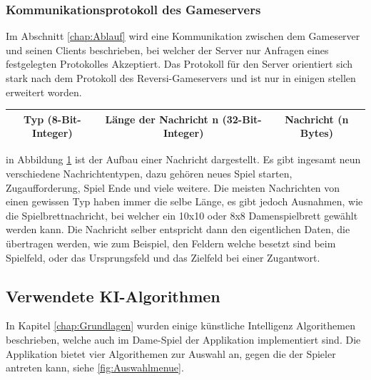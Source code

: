 \documentclass[12pt,a4paper,bibliography=totocnumbered,listof=totocnumbered]{article}
\begin{document}
\subsubsection{Kommunikationsprotokoll des Gameservers}
Im Abschnitt \ref{chap:Ablauf} wird eine Kommunikation zwischen dem Gameserver und seinen Clients beschrieben, bei welcher der 
Server nur Anfragen eines festgelegten Protokolles Akzeptiert. Das Protokoll für den Server orientiert sich stark nach dem Protokoll
des Reversi-Gameservers und ist nur in einigen stellen erweitert worden.
%
\begin{table}[H]
    \centering
    \begin{tabular} {|c|c|c|}
        \hline
        Typ (8-Bit-Integer) & Länge der Nachricht n (32-Bit-Integer) & Nachricht (n Bytes) \\
        \hline
    \end{tabular}
    \label{fig:Nachritenaufbau}
\end{table}

in Abbildung \ref{fig:Nachritenaufbau} ist der Aufbau einer Nachricht dargestellt. Es gibt ingesamt neun verschiedene Nachrichtentypen, dazu gehören 
neues Spiel starten, Zugaufforderung, Spiel Ende und viele weitere. Die meisten Nachrichten von einen gewissen Typ haben immer die selbe Länge, es gibt jedoch
Ausnahmen, wie die Spielbrettnachricht, bei welcher ein 10x10 oder 8x8 Damenspielbrett gewählt werden kann. Die Nachricht selber entspricht dann den eigentlichen 
Daten, die übertragen werden, wie zum Beispiel, den Feldern welche besetzt sind beim Spielfeld, oder das Ursprungsfeld und das Zielfeld bei einer Zugantwort. 

\subsection{Verwendete KI-Algorithmen}
In Kapitel \ref{chap:Grundlagen} wurden einige künstliche Intelligenz Algorithemen beschrieben, welche auch im Dame-Spiel der Applikation implementiert sind.
Die Applikation bietet vier Algorithemen zur Auswahl an, gegen die der Spieler antreten kann, siehe \ref{fig:Auswahlmenue}. 
\end{document}
